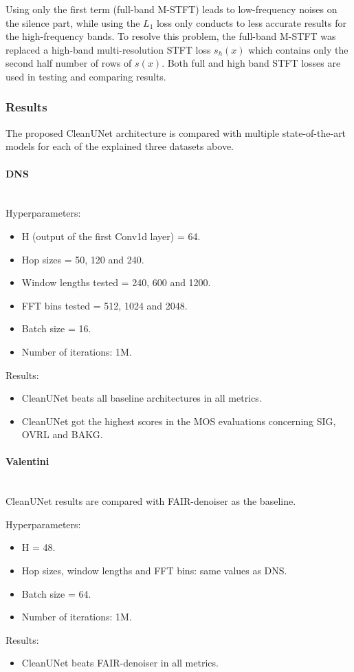 Using only the first term (full-band M-STFT) leads to low-frequency noises on the silence part, while using the $L_1$ loss only conducts to less accurate results for the high-frequency bands.
To resolve this problem, the full-band M-STFT was replaced a high-band multi-resolution STFT loss $s_h(x)$ which contains only the second half number of rows of $s(x)$.
Both full and high band STFT losses are used in testing and comparing results.

\subsubsection{Results}
The proposed CleanUNet architecture is compared with multiple state-of-the-art models for each of the explained three datasets above.

\paragraph{DNS}\mbox{}\\
Hyperparameters:
\begin{itemize}
    \item H (output of the first Conv1d layer) = 64.
    \item Hop sizes = 50, 120 and 240.
    \item Window lengths tested = 240, 600 and 1200.
    \item FFT bins tested = 512, 1024 and 2048.
    \item Batch size = 16.
    \item Number of iterations: 1M.
\end{itemize}
Results:
\begin{itemize}
    \item CleanUNet beats all baseline architectures in all metrics.
    \item CleanUNet got the highest scores in the MOS evaluations concerning SIG, OVRL and BAKG.
\end{itemize}

\paragraph{Valentini}\mbox{}\\
CleanUNet results are compared with FAIR-denoiser as the baseline.

Hyperparameters:
\begin{itemize}
    \item H = 48.
    \item Hop sizes, window lengths and FFT bins: same values as DNS.
    \item Batch size = 64.
    \item Number of iterations: 1M.
\end{itemize}
Results:
\begin{itemize}
    \item CleanUNet beats FAIR-denoiser in all metrics.
\end{itemize}

